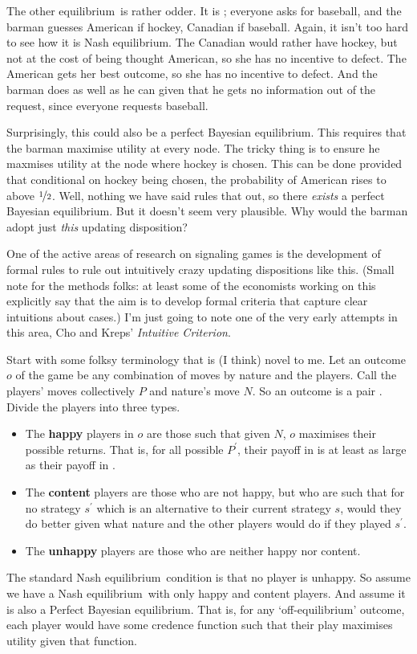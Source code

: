 \documentclass[openany]{book}
\newcommand{\eqm}{equilibrium}
\begin{document}
The other \eqm\ is rather odder. It is ; everyone asks for baseball, and the barman guesses American if hockey, Canadian if baseball. Again, it isn't too hard to see how it is Nash \eqm. The Canadian would rather have hockey, but not at the cost of being thought American, so she has no incentive to defect. The American gets her best outcome, so she has no incentive to defect. And the barman does as well as he can given that he gets no information out of the request, since everyone requests baseball.

Surprisingly, this could also be a perfect Bayesian \eqm. This requires that the barman maximise utility at every node. The tricky thing is to ensure he maxmises utility at the node where hockey is chosen. This can be done provided that conditional on hockey being chosen, the probability of American rises to above  $\nicefrac{1}{2}$. Well, nothing we have said rules that out, so there \textit{exists} a perfect Bayesian \eqm. But it doesn't seem very plausible. Why would the barman adopt just \textit{this} updating disposition?

One of the active areas of research on signaling games is the development of formal rules to rule out intuitively crazy updating dispositions like this. (Small note for the methods folks: at least some of the economists working on this explicitly say that the aim is to develop formal criteria that capture clear intuitions about cases.) I'm just going to note one of the very early attempts in this area, Cho and Kreps' \textit{Intuitive Criterion}.

Start with some folksy terminology that is (I think) novel to me. Let an outcome $o$ of the game be any combination of moves by nature and the players. Call the players'  moves collectively $P$ and nature's move $N$. So an outcome is a pair . Divide the players into three types.

\begin{itemize}
\item The \textbf{happy} players in $o$ are those such that given $N$, $o$ maximises their possible returns. That is, for all possible $P^\prime$, their payoff in  is at least as large as their payoff in .
\item The \textbf{content} players are those who are not happy, but who are such that for no strategy $s^\prime$ which is an alternative to their current strategy $s$, would they do better given what nature and the other players would do if they played $s^\prime$.
\item The \textbf{unhappy} players are those who are neither happy nor content.
\end{itemize}
The standard Nash \eqm\ condition is that no player is unhappy. So assume we have a Nash \eqm\, with only happy and content players. And assume it is also a Perfect Bayesian \eqm. That is, for any `off-\eqm' outcome, each player would have some credence function such that their play maximises utility given that function.
\end{document}
